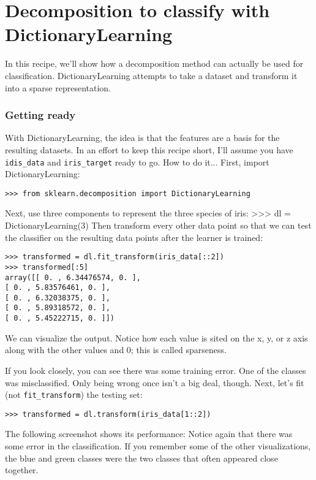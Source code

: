 \section{Decomposition to classify with DictionaryLearning}
In this recipe, we'll show how a decomposition method can actually be used for
classification. DictionaryLearning attempts to take a dataset and transform
it into a sparse representation.
\subsubsection{Getting ready}
With DictionaryLearning, the idea is that the features are a basis for the resulting
datasets. In an effort to keep this recipe short, I'll assume you have \texttt{idis\_data} and
\texttt{iris\_target} ready to go.
How to do it...
First, import DictionaryLearning:
\begin{framed}
\begin{verbatim}
>>> from sklearn.decomposition import DictionaryLearning
\end{verbatim}
\end{framed}
Next, use three components to represent the three species of iris:
>>> dl = DictionaryLearning(3)
Then transform every other data point so that we can test the classifier on the resulting data
points after the learner is trained:
\begin{framed}
\begin{verbatim}
>>> transformed = dl.fit_transform(iris_data[::2])
>>> transformed[:5]
array([[ 0. , 6.34476574, 0. ],
[ 0. , 5.83576461, 0. ],
[ 0. , 6.32038375, 0. ],
[ 0. , 5.89318572, 0. ],
[ 0. , 5.45222715, 0. ]])
\end{verbatim}
\end{framed}
We can visualize the output. Notice how each value is sited on the x, y, or z axis along with the
other values and 0; this is called sparseness.

If you look closely, you can see there was some training error. One of the classes was
misclassified. Only being wrong once isn't a big deal, though.
Next, let's fit (not \texttt{fit\_transform}) the testing set:
\begin{framed}
	\begin{verbatim}
>>> transformed = dl.transform(iris_data[1::2])
\end{verbatim}
\end{framed}
The following screenshot shows its performance:
Notice again that there was some error in the classification. If you remember some of the
other visualizations, the blue and green classes were the two classes that often appeared
close together.
